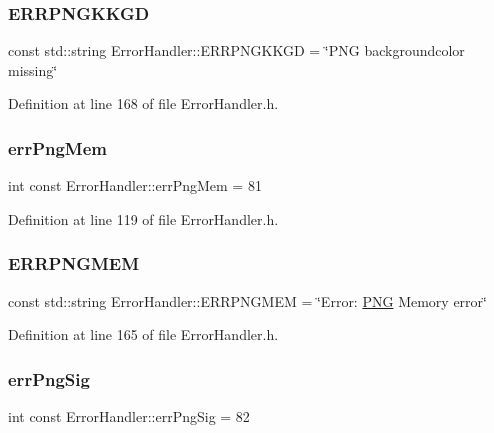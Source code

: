 \subsubsection{\texorpdfstring{ERRPNGKKGD}{ERRPNGKKGD}}
{\footnotesize\ttfamily const std\+::string Error\+Handler\+::\+E\+R\+R\+P\+N\+G\+K\+K\+GD = \char`\"{}P\+NG backgroundcolor missing\char`\"{}\hspace{0.3cm}{\ttfamily [static]}}



Definition at line 168 of file Error\+Handler.\+h.

\mbox{\label{classErrorHandler_a07cc422c69b1e7138800ec16524bd9e4}} 
\subsubsection{\texorpdfstring{errPngMem}{errPngMem}}
{\footnotesize\ttfamily int const Error\+Handler\+::err\+Png\+Mem = 81\hspace{0.3cm}{\ttfamily [static]}}



Definition at line 119 of file Error\+Handler.\+h.

\mbox{\label{classErrorHandler_adb02df3c256a08a19be5c1f5a0f3ca08}} 
\subsubsection{\texorpdfstring{ERRPNGMEM}{ERRPNGMEM}}
{\footnotesize\ttfamily const std\+::string Error\+Handler\+::\+E\+R\+R\+P\+N\+G\+M\+EM = \char`\"{}Error\+: \mbox{\hyperlink{constants_8h_afac9cfa577b92c66f46f7603f2f9fc14}{P\+NG}} Memory error\char`\"{}\hspace{0.3cm}{\ttfamily [static]}}



Definition at line 165 of file Error\+Handler.\+h.

\mbox{\label{classErrorHandler_a1b8c14322c54e4789f9d29503f939b5b}} 
\subsubsection{\texorpdfstring{errPngSig}{errPngSig}}
{\footnotesize\ttfamily int const Error\+Handler\+::err\+Png\+Sig = 82\hspace{0.3cm}{\ttfamily [static]}}



